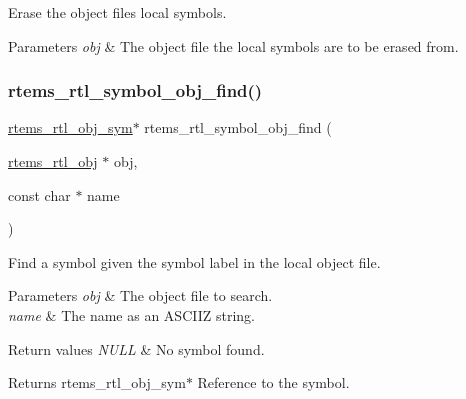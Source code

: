 Erase the object file\textquotesingle{}s local symbols.


\begin{DoxyParams}{Parameters}
{\em obj} & The object file the local symbols are to be erased from. \\
\hline
\end{DoxyParams}
\mbox{\label{rtl-sym_8c_a98e04c5083c6560c69802ee44b839459}} 
\subsubsection{\texorpdfstring{rtems\_rtl\_symbol\_obj\_find()}{rtems\_rtl\_symbol\_obj\_find()}}
{\footnotesize\ttfamily \mbox{\hyperlink{structrtems__rtl__obj__sym}{rtems\+\_\+rtl\+\_\+obj\+\_\+sym}}$\ast$ rtems\+\_\+rtl\+\_\+symbol\+\_\+obj\+\_\+find (\begin{DoxyParamCaption}\item[{\mbox{\hyperlink{structrtems__rtl__obj}{rtems\+\_\+rtl\+\_\+obj}} $\ast$}]{obj,  }\item[{const char $\ast$}]{name }\end{DoxyParamCaption})}

Find a symbol given the symbol label in the local object file.


\begin{DoxyParams}{Parameters}
{\em obj} & The object file to search. \\
\hline
{\em name} & The name as an A\+S\+C\+I\+IZ string. \\
\hline
\end{DoxyParams}

\begin{DoxyRetVals}{Return values}
{\em N\+U\+LL} & No symbol found. \\
\hline
\end{DoxyRetVals}
\begin{DoxyReturn}{Returns}
rtems\+\_\+rtl\+\_\+obj\+\_\+sym$\ast$ Reference to the symbol. 
\end{DoxyReturn}
\mbox{\label{rtl-sym_8c_a450818df431a0b6254e933f45497c281}} 
